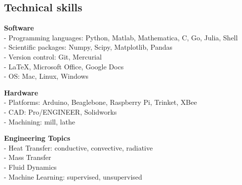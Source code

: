 \documentclass[]{res}
\begin{document}
\begin{resume}
\section{Technical skills}
\vspace{0.1in}

\textbf{Software} \\
- Programming languages: Python, Matlab, Mathematica, C, Go, Julia, Shell \\
- Scientific packages: Numpy, Scipy, Matplotlib, Pandas \\
- Version control: Git, Mercurial \\
- LaTeX, Microsoft Office, Google Docs \\
- OS: Mac, Linux, Windows \\

\vspace{-0.2in}

\textbf{Hardware} \\
- Platforms: Arduino, Beaglebone, Raspberry Pi, Trinket, XBee \\
- CAD: Pro/ENGINEER, Solidworks \\
- Machining: mill, lathe \\

\vspace{-0.2in}

\textbf{Engineering Topics} \\
- Heat Transfer: conductive, convective, radiative \\
- Mass Transfer \\
- Fluid Dynamics \\
- Machine Learning: supervised, unsupervised \\


\end{resume}
\end{document}
